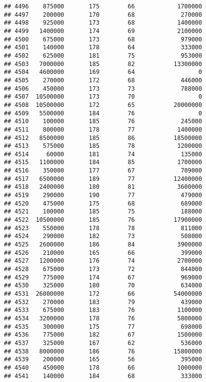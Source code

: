 \documentclass[
]{article}
\begin{document}
\begin{verbatim}
## 4496    875000       175        66            1700000
## 4497    200000       170        68             270000
## 4498    925000       173        68            1400000
## 4499   1400000       174        69            2100000
## 4500    675000       173        68             979000
## 4501    140000       178        64             333000
## 4502    625000       181        75             953000
## 4503   7000000       185        82           13300000
## 4504   4600000       169        64                  0
## 4505    270000       172        68             446000
## 4506    450000       173        73             788000
## 4507  10500000       173        70                  0
## 4508  10500000       172        65           20000000
## 4509   5500000       184        76                  0
## 4510    100000       185        76             245000
## 4511    800000       178        77            1400000
## 4512   8500000       185        86           18500000
## 4513    575000       185        78            1200000
## 4514     60000       181        74             135000
## 4515   1100000       184        85            1700000
## 4516    350000       177        67             709000
## 4517   6500000       189        77           12400000
## 4518   2400000       180        81            3600000
## 4519    290000       190        77             479000
## 4520    475000       175        68             689000
## 4521    100000       185        75             188000
## 4522  10500000       185        76           17900000
## 4523    550000       178        78             811000
## 4524    290000       182        73             508000
## 4525   2600000       186        84            3900000
## 4526    210000       165        66             399000
## 4527   1200000       176        74            2700000
## 4528    675000       173        72             844000
## 4529    775000       174        67             969000
## 4530    325000       180        70             634000
## 4531  26000000       172        66           54000000
## 4532    270000       183        79             439000
## 4533    675000       183        76            1100000
## 4534   3200000       178        76            5800000
## 4535    300000       175        77             698000
## 4536    775000       182        67            1500000
## 4537    325000       167        62             536000
## 4538   8000000       186        76           15800000
## 4539    200000       165        56             395000
## 4540    450000       178        66            1000000
## 4541    140000       184        68             333000

\end{verbatim}
\end{document}
